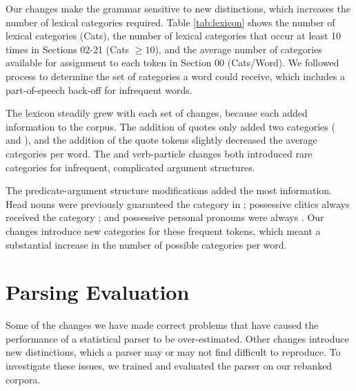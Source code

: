 \documentclass[11pt]{article}
\begin{document}

Our changes make the grammar sensitive to new distinctions, which increases the
number of lexical categories required. Table \ref{tab:lexicon} shows the
number of lexical categories (Cats), the number of lexical categories that occur at
least 10 times in Sections 02-21 (Cats $\ge10$), and the average number of
categories available for assignment to each token in Section 00 (Cats/Word). We
followed  process to determine the set of categories a word could
receive, which includes a part-of-speech back-off for infrequent words.

The lexicon steadily grew with each set of changes, because each added
information to the corpus. The addition of quotes only added two
categories ( and ), and the addition of the quote
tokens slightly decreased the average categories per word. The \propbank and
verb-particle changes both introduced rare categories for infrequent,
complicated argument structures.

The  predicate-argument structure modifications added the most
information. Head nouns were previously guaranteed the category  in
\ccgbank; possessive clitics always received the category ;
and possessive personal pronouns were always . Our changes introduce
new categories for these frequent tokens, which meant a substantial
increase in the number of possible categories per word.


\section{Parsing Evaluation}





Some of the changes we have made correct problems that have caused
the performance of a statistical \ccg parser to be over-estimated. Other changes
introduce new distinctions, which a parser may or may not find difficult to reproduce.
To investigate these issues, we trained and evaluated the \candc \ccg parser on
our rebanked corpora.
\end{document}
